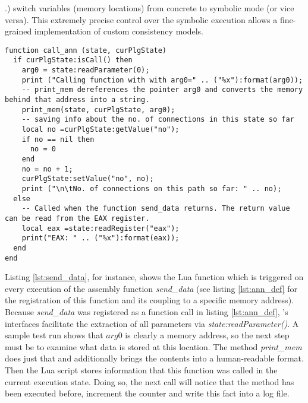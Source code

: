 .) switch variables (memory locations) from concrete to symbolic mode (or vice versa).
This extremely precise control over the symbolic execution allows a fine-grained implementation of custom consistency models.


\bigskip
\begin{lstlisting}[language={[5.0]Lua}, basicstyle=\ttfamily\footnotesize, caption={Lua function executed upon every call of the function send\_data(). See lines 18 - 24 in listing \ref{lst:ann_def} for the registration of \textit{call\_ann}.}, label={lst:send_data}]
function call_ann (state, curPlgState)
  if curPlgState:isCall() then
    arg0 = state:readParameter(0);
    print ("Calling function with with arg0=" .. ("%x"):format(arg0));
    -- print_mem dereferences the pointer arg0 and converts the memory behind that address into a string.
    print_mem(state, curPlgState, arg0);
    -- saving info about the no. of connections in this state so far
    local no =curPlgState:getValue("no");
    if no == nil then
      no = 0
    end
    no = no + 1;
    curPlgState:setValue("no", no);
    print ("\n\tNo. of connections on this path so far: " .. no);
  else
    -- Called when the function send_data returns. The return value can be read from the EAX register.
    local eax =state:readRegister("eax");
    print("EAX: " .. ("%x"):format(eax));
  end
end
\end{lstlisting}
\bigskip

Listing \ref{lst:send_data}, for instance, shows the Lua function which is triggered on every execution of the assembly function \textit{send\_data} (see listing \ref{lst:ann_def} for the registration of this function and its coupling to a specific memory address).
Because \textit{send\_data} was registered as a function call in listing \ref{lst:ann_def}, \sse's interfaces facilitate the extraction of all parameters via \textit{state:readParameter()}.
A sample test run shows that $arg0$ is clearly a memory address, so the next step must be to examine what data is stored at this location.
The method \textit{print\_mem} does just that and additionally brings the contents into a human-readable format.
Then the Lua script stores information that this function was called in the current execution state.
Doing so, the next call will notice that the method has been executed before, increment the counter and write this fact into a log file.

